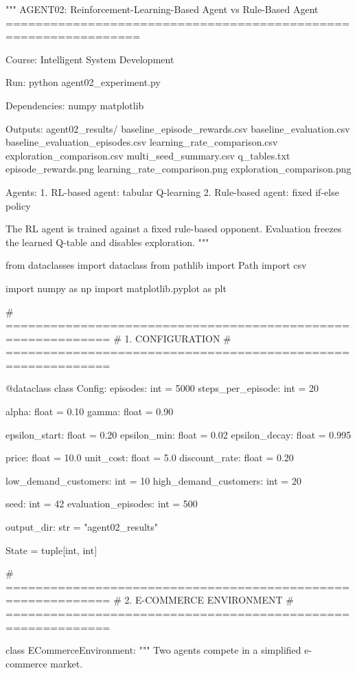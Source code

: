 
"""
AGENT02: Reinforcement-Learning-Based Agent vs Rule-Based Agent
================================================================

Course: Intelligent System Development

Run:
    python agent02_experiment.py

Dependencies:
    numpy
    matplotlib

Outputs:
    agent02_results/
        baseline_episode_rewards.csv
        baseline_evaluation.csv
        baseline_evaluation_episodes.csv
        learning_rate_comparison.csv
        exploration_comparison.csv
        multi_seed_summary.csv
        q_tables.txt
        episode_rewards.png
        learning_rate_comparison.png
        exploration_comparison.png

Agents:
    1. RL-based agent: tabular Q-learning
    2. Rule-based agent: fixed if-else policy

The RL agent is trained against a fixed rule-based opponent.
Evaluation freezes the learned Q-table and disables exploration.
"""

from dataclasses import dataclass
from pathlib import Path
import csv

import numpy as np
import matplotlib.pyplot as plt


# ============================================================
# 1. CONFIGURATION
# ============================================================

@dataclass
class Config:
    episodes: int = 5000
    steps_per_episode: int = 20

    alpha: float = 0.10
    gamma: float = 0.90

    epsilon_start: float = 0.20
    epsilon_min: float = 0.02
    epsilon_decay: float = 0.995

    price: float = 10.0
    unit_cost: float = 5.0
    discount_rate: float = 0.20

    low_demand_customers: int = 10
    high_demand_customers: int = 20

    seed: int = 42
    evaluation_episodes: int = 500

    output_dir: str = "agent02_results"


State = tuple[int, int]


# ============================================================
# 2. E-COMMERCE ENVIRONMENT
# ============================================================

class ECommerceEnvironment:
    """
    Two agents compete in a simplified e-commerce market.

